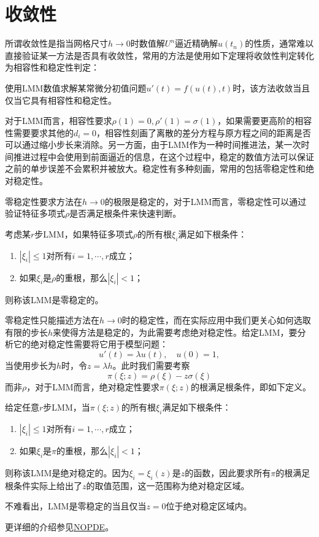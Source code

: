 \documentclass[a4paper,10pt]{ctexart}
\begin{document}
\section{收敛性}
所谓收敛性是指当网格尺寸$ h\to 0 $时数值解$ U^n $逼近精确解$ u(t_n) $的性质，通常难以直接验证某一方法是否具有收敛性，常用的方法是使用如下定理将收敛性判定转化为相容性和稳定性判定：
\begin{theorem}
    使用LMM数值求解某常微分初值问题$ u'(t)=f(u(t),t) $时，该方法收敛当且仅当它具有相容性和稳定性。
\end{theorem}
对于LMM而言，相容性要求$ \rho(1)=0,\rho'(1)=\sigma(1) $，如果需要更高阶的相容性需要要求其他的$ d_i=0 $，相容性刻画了离散的差分方程与原方程之间的距离是否可以通过缩小步长来消除。另一方面，由于LMM作为一种时间推进法，某一次时间推进过程中会使用到前面逼近的信息，在这个过程中，稳定的数值方法可以保证之前的单步误差不会累积并被放大。稳定性有多种刻画，常用的包括零稳定性和绝对稳定性。

零稳定性要求方法在$ h\to 0 $的极限是稳定的，对于LMM而言，零稳定性可以通过验证特征多项式$ \rho $是否满足根条件来快速判断。
\begin{definition}
    考虑某$ r $步LMM，如果特征多项式$ \rho $的所有根$ \xi_i $满足如下根条件：
    \begin{enumerate}
        \item $ |\xi_i|\leqslant 1 $对所有$ i=1,\cdots ,r $成立；
        \item 如果$ \xi_i $是$ \rho $的重根，那么$ |\xi_i|<1 $；
    \end{enumerate}
    则称该LMM是零稳定的。
\end{definition}

零稳定性只能描述方法在$ h\to 0 $时的稳定性，而在实际应用中我们更关心如何选取有限的步长$ h $来使得方法是稳定的，为此需要考虑绝对稳定性。给定LMM，要分析它的绝对稳定性需要将它用于模型问题：
\begin{equation}
    u'(t) = \lambda u(t),\quad u(0) = 1,
\end{equation}
当使用步长为$ h $时，令$ z=\lambda h $。此时我们需要考察
\begin{equation}
    \pi(\xi;z) = \rho(\xi) - z \sigma(\xi)
\end{equation}
而非$ \rho $，对于LMM而言，绝对稳定性要求$ \pi(\xi;z) $的根满足根条件，即如下定义。
\begin{definition}
    给定任意$ r $步LMM，当$ \pi(\xi;z) $的所有根$ \xi_i $满足如下根条件：
    \begin{enumerate}
        \item $ |\xi_i|\leqslant 1 $对所有$ i=1,\cdots ,r $成立；
        \item 如果$ \xi_i $是$ \pi $的重根，那么$ |\xi_i|<1 $；
    \end{enumerate}
    则称该LMM是绝对稳定的。因为$ \xi_i = \xi_i(z) $是$ z $的函数，因此要求所有$ \pi $的根满足根条件实际上给出了$ z $的取值范围，这一范围称为绝对稳定区域。
\end{definition}
\noindent 不难看出，LMM是零稳定的当且仅当$ z=0 $位于绝对稳定区域内。

更详细的介绍参见\href{https://gypsophila-cx.github.io/2024/05/29/Error_FDM/}{NOPDE}。
\end{document}
